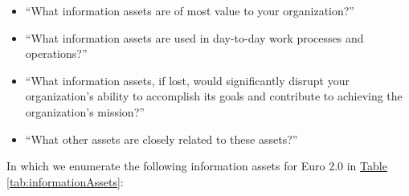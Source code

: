 \documentclass[12pt]{article} %
\newcommand{\hypertableref}[1]{\hyperref[#1]{Table \ref{#1}}}
\begin{document}
{\begin{itemize}
	\item ``What information assets are of most value to your organization?''
	\item ``What information assets are used in day-to-day work processes and operations?''
	\item ``What information assets, if lost, would significantly disrupt your organization’s ability to accomplish its goals and contribute to achieving the organization’s mission?''
	\item ``What other assets are closely related to these assets?''
\end{itemize}

In which we enumerate the following information assets for Euro 2.0 in \hypertableref{tab:informationAssets}:

}
\end{document}
